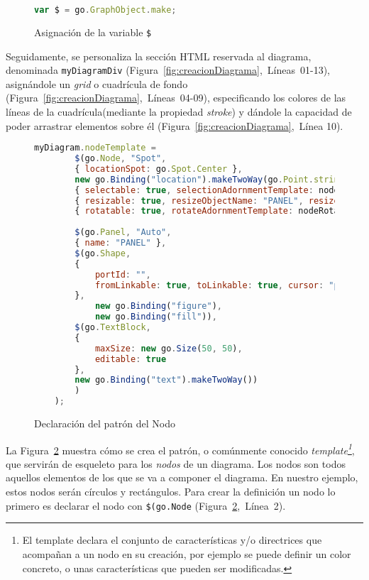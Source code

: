 \begin{figure}[!tb]
	\centering
	\begin{lstlisting}[language=JavaScript]
	var $ = go.GraphObject.make;
	\end{lstlisting}
	\caption{Asignación de la variable \texttt{\$}}
	\label{fig:asignacionDollar}
\end{figure}

Seguidamente, se personaliza la sección HTML reservada al diagrama, denominada \texttt{myDiagramDiv} (Figura~\ref{fig:creacionDiagrama},~Líneas~01-13), asignándole un \emph{grid} o cuadrícula de fondo (Figura~\ref{fig:creacionDiagrama},~Líneas~04-09), especificando los colores de las líneas de la cuadrícula(mediante la propiedad \emph{stroke})  y dándole la capacidad de poder arrastrar elementos sobre él (Figura~\ref{fig:creacionDiagrama},~Línea 10).

\begin{figure}[!tb]
	\centering
	\begin{lstlisting}[language=JavaScript]
	myDiagram.nodeTemplate =
		$(go.Node, "Spot",
		{ locationSpot: go.Spot.Center },
		new go.Binding("location").makeTwoWay(go.Point.stringify),
		{ selectable: true, selectionAdornmentTemplate: nodeSelectionAdornmentTemplate },
		{ resizable: true, resizeObjectName: "PANEL", resizeAdornmentTemplate: nodeResizeAdornmentTemplate },
		{ rotatable: true, rotateAdornmentTemplate: nodeRotateAdornmentTemplate },
	
		$(go.Panel, "Auto",
		{ name: "PANEL" },
		$(go.Shape,  
		{
			portId: "", 
			fromLinkable: true, toLinkable: true, cursor: "pointer",
		},
			new go.Binding("figure"),
			new go.Binding("fill")),
		$(go.TextBlock,
		{
			maxSize: new go.Size(50, 50),
			editable: true
		},
		new go.Binding("text").makeTwoWay())
		)
	);
	\end{lstlisting}
\caption{Declaración del patrón del Nodo}
\label{fig:patronNodo}
\end{figure}

La Figura~\ref{fig:patronNodo} muestra cómo se crea el patrón, o comúnmente conocido \emph{template\footnote{El template declara el conjunto de características y/o directrices que acompañan a un nodo en su creación, por ejemplo se puede definir un color concreto, o unas características que pueden ser modificadas.}}, que servirán de esqueleto para los \emph{nodos} de un diagrama. Los nodos son todos aquellos elementos de los que se va a componer el diagrama. En nuestro ejemplo, estos nodos serán círculos y rectángulos. Para crear la definición un nodo lo primero es declarar el nodo con \texttt{\$(go.Node} (Figura~\ref{fig:patronNodo},~Línea~2). 

